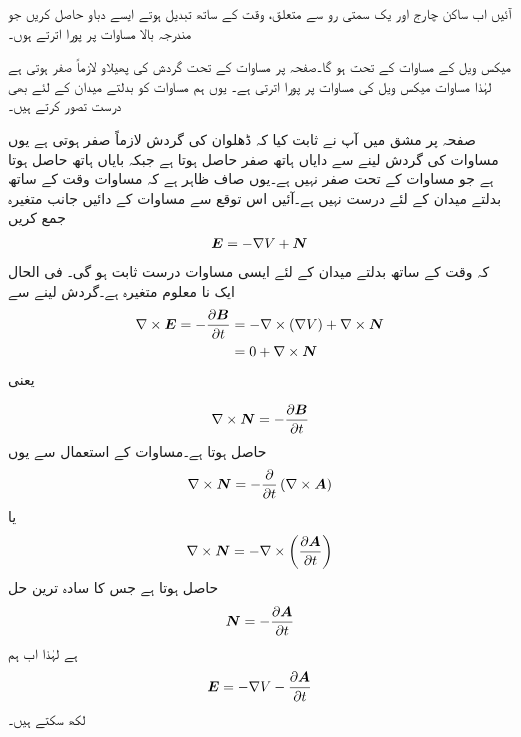 آئیں اب ساکن چارج اور یک سمتی رو سے متعلق، وقت کے ساتھ تبدیل ہوتے ایسے دباو حاصل کریں جو مندرجہ بالا مساوات پر پورا اترتے ہوں۔

میکس ویل کے مساوات کے تحت  ہو گا۔صفحہ  پر مساوات  کے تحت گردش کی پھیلاو لازماً صفر ہوتی ہے لہٰذا مساوات  میکس ویل کی مساوات  پر پورا اترتی ہے۔ یوں ہم مساوات  کو بدلتے میدان کے لئے بھی درست تصور کرتے ہیں۔


صفحہ  پر مشق  میں آپ نے ثابت کیا کہ ڈھلوان کی گردش لازماً صفر ہوتی ہے یوں مساوات  کی گردش لینے سے دایاں ہاتھ صفر حاصل ہوتا ہے جبکہ بایاں ہاتھ  حاصل ہوتا ہے جو مساوات  کے تحت صفر نہیں ہے۔یوں صاف ظاہر ہے کہ مساوات  وقت کے ساتھ بدلتے میدان کے لئے درست نہیں ہے۔آئیں اس توقع سے مساوات  کے دائیں جانب متغیرہ  جمع کریں
\begin{align*}
{\ensuremath{{\boldsymbol{E}}}}=-\nabla V +{{\boldsymbol{N}}}
\end{align*}
 کہ وقت کے ساتھ بدلتے میدان کے لئے ایسی مساوات درست ثابت ہو گی۔ فی الحال  ایک نا معلوم متغیرہ ہے۔گردش لینے سے
\begin{align*}
\nabla \times {\ensuremath{{\boldsymbol{E}}}}=-\frac{\partial {\ensuremath{{\boldsymbol{B}}}}}{\partial t} &=-\nabla \times \left( \nabla V\right) +\nabla \times {\ensuremath{{\boldsymbol{N}}}}\\
&=0+\nabla \times {\ensuremath{{\boldsymbol{N}}}}
\end{align*}
یعنی

\begin{align*}
\nabla \times {\ensuremath{{\boldsymbol{N}}}}=-\frac{\partial {\ensuremath{{\boldsymbol{B}}}}}{\partial t}
\end{align*}
حاصل ہوتا ہے۔مساوات  کے استعمال سے یوں
\begin{align*}
\nabla \times {\ensuremath{{\boldsymbol{N}}}}=-\frac{\partial }{\partial t} \left(\nabla \times {\ensuremath{{\boldsymbol{A}}}} \right)
\end{align*}
یا
\begin{align*}
\nabla \times {\ensuremath{{\boldsymbol{N}}}}=-\nabla \times \left(\frac{\partial {\ensuremath{{\boldsymbol{A}}}}}{\partial t} \right)
\end{align*}
حاصل ہوتا ہے جس کا سادہ ترین حل
\begin{align*}
{\ensuremath{{\boldsymbol{N}}}}=-\frac{\partial {\ensuremath{{\boldsymbol{A}}}}}{\partial t}
\end{align*}
ہے لہٰذا اب ہم
\begin{align}\label{مساوات_میکس-ویل_بدلتا_میدان_مساوات_ٹ}
{\ensuremath{{\boldsymbol{E}}}}=-\nabla V -\frac{\partial {\ensuremath{{\boldsymbol{A}}}}}{\partial t}
\end{align}
 لکھ سکتے ہیں۔

